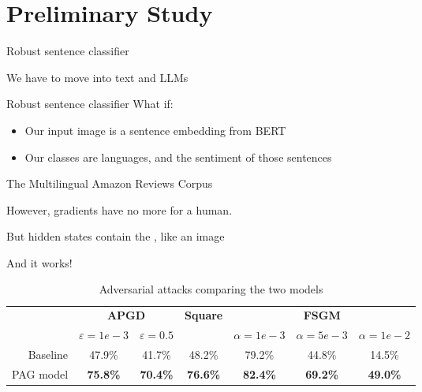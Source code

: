 \section{Preliminary Study}

\begin{frame}{Robust sentence classifier}
    \begin{center}
        We have to move into text and LLMs
    \end{center}
\end{frame}

\begin{frame}{Robust sentence classifier}
    What if:
    \begin{itemize}
        \item Our input image is a sentence embedding from BERT
        \item Our classes are languages, and the sentiment of those sentences
    \end{itemize}

    \vfill
    \begin{center}
        \footnotesize    The Multilingual Amazon Reviews Corpus
    \end{center}

    \vfill
    \pause
    \centering
    However, gradients have no more  for a human.

    But hidden states contain the , like an image
\end{frame}

\begin{frame}{And it works!}
\begin{table}[]
\begin{tabular}{lcclccc}
\toprule
                             & \multicolumn{2}{c}{\textbf{APGD}}          & \textbf{Square}                     & \multicolumn{3}{c}{\textbf{FSGM}}                                                                               \\
                             & $\varepsilon = 1e-3$ & $\varepsilon = 0.5$ &                                     & \multicolumn{1}{l}{$\alpha = 1e-3$} & \multicolumn{1}{l}{$\alpha = 5e-3$} & \multicolumn{1}{l}{$\alpha = 1e-2$} \\
 \midrule
\multicolumn{1}{r}{Baseline} & 47.9\%               & 41.7\%              & \multicolumn{1}{c}{48.2\%}          & 79.2\%                              & 44.8\%                              & 14.5\%                              \\
\multicolumn{1}{r}{PAG model}   & \textbf{75.8\%}      & \textbf{70.4\%}     & \multicolumn{1}{c}{\textbf{76.6\%}} & \textbf{82.4\%}                     & \textbf{69.2\%}                     & \textbf{49.0\%}                    \\
\bottomrule
\end{tabular}
\vspace{0.25cm}
\caption{Adversarial attacks comparing the two models}
\label{table:pag__binary_classifier_robustness}
\end{table}
\end{frame}

